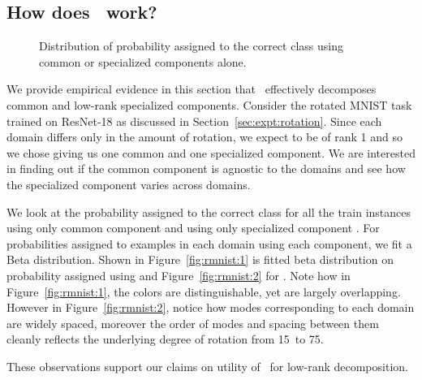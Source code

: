 \documentclass{article}
\begin{document}
\subsection{How does \mos\ work?}
\begin{figure*}[htb]
  \qquad
  \caption{Distribution of probability assigned to the correct class using common or specialized components alone.}
  \label{fig:rmnist}
\end{figure*}


We provide empirical evidence in this section that \mos\ effectively decomposes common and low-rank specialized components. Consider the rotated MNIST task trained on ResNet-18 as discussed in Section~\ref{sec:expt:rotation}. Since each domain differs only in the amount of rotation, we expect  to be of rank 1 and so we chose  giving us one common and one specialized component. We are interested in finding out if the common component is agnostic to the domains and see how the specialized component varies across domains. 

We look at the probability assigned to the correct class for all the train instances using only common component  and using only specialized component . For probabilities assigned to examples in each domain using each component, we fit a Beta distribution. Shown in Figure~\ref{fig:rmnist:1} is fitted beta distribution on probability assigned using  and Figure~\ref{fig:rmnist:2} for . Note how in Figure~\ref{fig:rmnist:1}, the colors are distinguishable, yet are largely overlapping. However in Figure~\ref{fig:rmnist:2}, notice how modes corresponding to each domain are widely spaced, moreover the order of modes and spacing between them cleanly reflects the underlying degree of rotation from 15\degree\ to 75. 



These observations support our claims on utility of \mos\ for low-rank decomposition.
\end{document}
